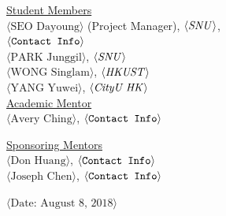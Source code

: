 \begin{center}
\vspace{0.35in}
\underline {Student Members}\\
\vspace{5pt}
$\langle \text{SEO Dayoung}\rangle$ (Project Manager), $\langle \text{\emph{SNU}}\rangle$,\\ 
\vspace{3pt}
$\langle \text{\texttt{Contact Info}} \rangle$\\
\vspace{5pt}
$\langle \text{PARK Junggil}\rangle$, $\langle \text{\emph{SNU}} \rangle$ \\
\vspace{3pt}
$\langle \text{WONG Singlam}\rangle$, $\langle \text{\emph{HKUST}} \rangle$ \\
\vspace{3pt}
$\langle \text{YANG Yuwei}\rangle$, $\langle \text{\emph{CityU HK}} \rangle$ \\

\vspace \shiftdownb
\underline {Academic Mentor} \\
\vspace{5pt}
$\langle \text{Avery Ching}\rangle$, $\langle \text{\texttt{Contact Info}} \rangle$

\vspace \shiftdownb
\underline {Sponsoring Mentors}\\
\vspace{5pt}
$\langle \text{Don Huang}\rangle$, $\langle \text{\texttt{Contact Info}} \rangle$\\
\vspace{3pt}
$\langle \text{Joseph Chen}\rangle$, $\langle \text{\texttt{Contact Info}} \rangle$


\vspace \shiftdowna
$\langle \text{Date: August 8, 2018}\rangle$ 

\end{center}


